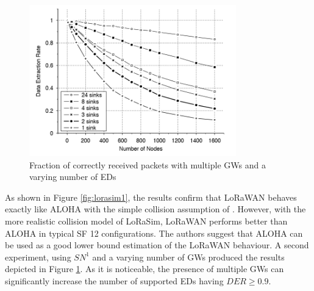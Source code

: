 \begin{figure}[tph]
    \centering
    \includegraphics[width=0.8\textwidth]{images/lorasim2.png}
    \caption{Fraction of correctly received packets with multiple \glspl{GW} and a varying number of \glspl{ED} \cite{ref:soa-lora-scal3}}
    \label{fig:lorasim2}
\end{figure}

As shown in Figure \ref{fig:lorasim1}, the results confirm that LoRaWAN behaves exactly like ALOHA with the simple collision assumption of \cite{ref:soa-lora-scal2}. However, with the more realistic collision model of LoRaSim, LoRaWAN performs better than ALOHA in typical \gls{SF} 12 configurations. The authors suggest that ALOHA can be used as a good lower bound estimation of the LoRaWAN behaviour. A second experiment, using $SN^1$ and a varying number of \glspl{GW} produced the results depicted in Figure \ref{fig:lorasim2}. As it is noticeable, the presence of multiple \glspl{GW} can significantly increase the number of supported \glspl{ED} having $DER \geq 0.9 $.


